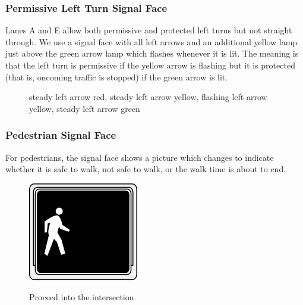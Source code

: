 \documentclass[letterpaper,twoside]{article}
\begin{document}
\subsubsection{Permissive Left Turn Signal Face}

Lanes A and E allow both permissive and protected left turns but not
straight through.  We use a signal face with all left arrows and an
additional yellow lamp just above the green arrow lamp which flashes
whenever it is lit.  The meaning is that the left turn is permissive
if the yellow arrow is flashing but it is  protected (that is, oncoming traffic
is stopped) if the green arrow is lit.

\begin{figure}[H]
           {\caption{steady left arrow red, steady left arrow yellow, flashing
               left arrow yellow, steady left arrow green}
             \label{signal_llll}}
\end{figure}

\subsubsection{Pedestrian Signal Face}

For pedestrians, the signal face shows a picture which changes to indicate
whether it is safe to walk, not safe to walk, or the walk time is about to end.

\begin{figure}[H]
  \fcapside
           {\includegraphics{MUTCD_Ped_Signal_-_Walk}}
           {\caption{Proceed into the intersection}}
\end{figure}
\end{document}
